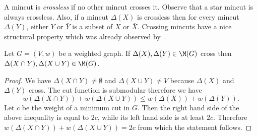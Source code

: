 A mincut is {\em crossless} if no other
mincut crosses it. Observe that a star mincut is always crossless.
Also, if a  mincut $\Delta(X)$ is crossless then
for every mincut $\Delta(Y)$, either $Y$ or $\bar{Y}$ is a subset of $X$ or $\bar{X}$.
Crossing mincuts have a nice structural property which was already observed by~\cite{DKL76}.

\begin{claim}
\label{claim:mincuts}
Let $G=(V,w)$ be a weighted graph.
If $\Delta(X), \Delta(Y) \in \M(G)$ cross then
$\Delta(X \cap Y), \Delta(X \cup Y)  \in \M(G)$.
\end{claim}

\begin{proof}
We have $\Delta(X \cap Y) \neq \emptyset $ and $ \Delta(X \cup Y) \neq V$ because $\Delta(X)$ and $\Delta(Y)$ cross. The cut function is submodular therefore we have
\begin{equation*}
\label{eq:mincuts}
w(\Delta(X \cap Y) ) + w(\Delta(X \cup Y) ) \leq w(\Delta(X)) + w(\Delta(Y)).
\end{equation*}
Let $c$ be the weight of a minimum cut in $G$. Then the right hand side of the above inequality
is equal to $2c$, while its left hand side is at least $2c$. Therefore
$w(\Delta(X \cap Y) ) + w(\Delta(X \cup Y) ) = 2c$ from which the statement follows.
\end{proof}
























































